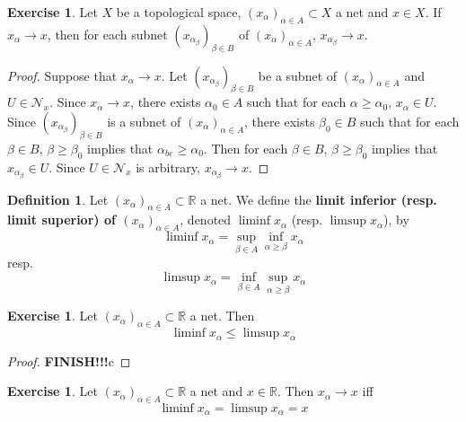 \documentclass[12pt]{amsart}
\theoremstyle{definition}
\newtheorem{defn}[definition]{Definition}
\newtheorem{ex}[definition]{Exercise}
\newcommand{\al}{\alpha}
\newcommand{\be}{\beta}
\newcommand{\R}{\mathbb{R}}
\newcommand{\MN}{\mathcal{N}}
\begin{document}
	\begin{ex}
		Let $X$ be a topological space, $(x_{\al})_{\al \in A} \subset X$ a net and $x \in X$. If $x_{\al} \rightarrow x$, then for each subnet $(x_{\al_{\be}})_{\be \in B}$ of $(x_{\al})_{\al \in A}$, $x_{\al_{\be}} \rightarrow x$.
	\end{ex}

	\begin{proof}
		Suppose that $x_{\al} \rightarrow x$. Let $(x_{\al_{\be}})_{\be \in B}$ be a subnet of $(x_{\al})_{\al \in A}$ and $U \in \MN_x$. Since $x_{\al} \rightarrow x$, there exists $\al_0 \in A$ such that for each $\al \geq \al_0$, $x_{\al} \in U$. Since $(x_{\al_{\be}})_{\be \in B}$ is a subnet of $(x_{\al})_{\al \in A}$, there exists $\be_0 \in B$ such that for each $\be \in B$, $\be \geq \be_0$ implies that $\al_{be} \geq \al_0$. Then for each $\be \in B$, $\be \geq \be_0$ implies that $x_{\al_{\be}} \in U$. Since $U \in \MN_x$ is arbitrary, $x_{\al_{\be}} \rightarrow x$.
	\end{proof}
	
	
	
	
	
	\begin{defn}
		Let $(x_{\al})_{\al \in A} \subset \R$ a net. We define the \textbf{limit inferior (resp. limit superior) of $(x_{\al})_{\al \in A}$}, denoted $\liminf x_{\al}$ (resp. $\limsup x_{\al}$), by 
		$$\liminf x_{\al} = \sup_{\beta \in A } \inf_{\al \geq \beta} x_{\al}$$ 
		resp. 
		$$\limsup x_{\al} = \inf_{\beta \in A } \sup_{\al \geq \beta} x_{\al}$$  
	\end{defn}

	\begin{ex}
		Let $(x_{\al})_{\al \in A} \subset \R$ a net. Then $$\liminf x_{\al} \leq \limsup x_{\al}$$
	\end{ex}

	\begin{proof}
		\textbf{FINISH!!!}c
	\end{proof}

	\begin{ex}
		Let $(x_{\al})_{\al \in A} \subset \R$ a net and $x \in \R$. Then $x_{\al} \rightarrow x$ iff $$\liminf x_{\al} = \limsup x_{\al} = x$$
	\end{ex}
\end{document}
